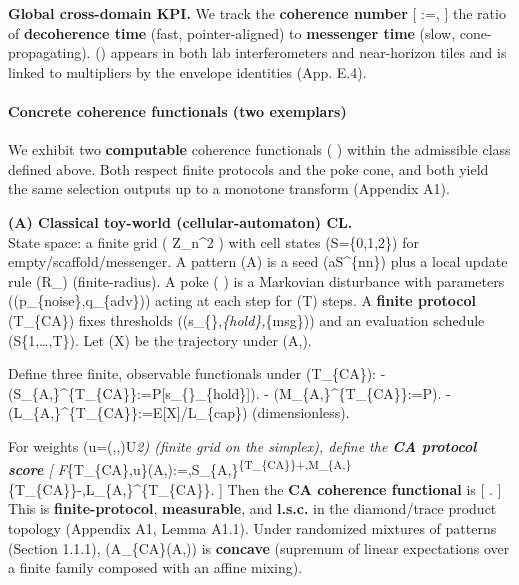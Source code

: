 \documentclass[
]{article}
\numberwithin{equation}{section}
\begin{document}
\textbf{Global cross-domain KPI.} We track the \textbf{coherence number}
{[} \chi:=, {]} the ratio of
\textbf{decoherence time} (fast, pointer-aligned) to \textbf{messenger
time} (slow, cone-propagating). (\chi) appears in both lab
interferometers and near-horizon tiles and is linked to multipliers by
the envelope identities (App. E.4).

\hypertarget{concrete-coherence-functionals-two-exemplars}{%
\paragraph{Concrete coherence functionals (two
exemplars)}\label{concrete-coherence-functionals-two-exemplars}}

We exhibit two \textbf{computable} coherence functionals (  )
within the admissible class defined above. Both respect finite protocols
and the poke cone, and both yield the same selection outputs up to a
monotone transform (Appendix A1).

\textbf{(A) Classical toy-world (cellular-automaton) CL.}\\
State space: a finite grid ( \mathbb Z\_n\^{}2 ) with cell states
(S=\{0,1,2\}) for empty/scaffold/messenger. A pattern (A) is a seed
(a\in S\^{}\{n\times n\}) plus a local update rule (R\_\theta)
(finite-radius). A poke ( \Phi ) is a Markovian disturbance with
parameters ((p\_\{\rm noise\},q\_\{\rm adv\})) acting at each step for
(T) steps. A \textbf{finite protocol} (T\_\{\rm CA\}) fixes thresholds
((s\_\{\min\},\tau\emph{\{\rm hold\},\theta}\{\rm msg\})) and an
evaluation schedule (\mathcal S\subset\{1,\dots,T\}). Let (X) be the
trajectory under (A,\Phi).

Define three finite, observable functionals under (T\_\{\rm CA\}): -
(S\_\{A,\Phi\}\^{}\{T\_\{\rm CA\}\}:=\mathbb P{[}\ge s\_\{\min\}\ge \tau\_\{\rm hold\}{]}).
-
(M\_\{A,\Phi\}\^{}\{T\_\{\rm CA\}\}:=\mathbb P).
-
(L\_\{A,\Phi\}\^{}\{T\_\{\rm CA\}\}:=\mathbb E{[}X{]}/L\_\{\rm cap\})
(dimensionless).

For weights (u=(\alpha,\beta,\gamma)\in\mathcal U\subset\Delta\emph{2)
(finite grid on the simplex), define the \textbf{CA protocol score} {[}
F}\{T\_\{\rm CA\},u\}(A,\Phi):=\alpha,S\_\{A,\Phi\}\textsuperscript{\{T\_\{\rm CA\}\}+\beta,M\_\{A,\Phi\}}\{T\_\{\rm CA\}\}-\gamma,L\_\{A,\Phi\}\^{}\{T\_\{\rm CA\}\}\in[-1,1].
{]} Then the \textbf{CA coherence functional} is {[}
.
{]} This is \textbf{finite-protocol}, \textbf{measurable}, and
\textbf{l.s.c.} in the diamond/trace product topology (Appendix A1,
Lemma A1.1). Under randomized mixtures of patterns (Section 1.1.1),
(A\mapsto {}\_\{\rm CA\}(A,\Phi)) is \textbf{concave} (supremum
of linear expectations over a finite family composed with an affine
mixing).
\end{document}

